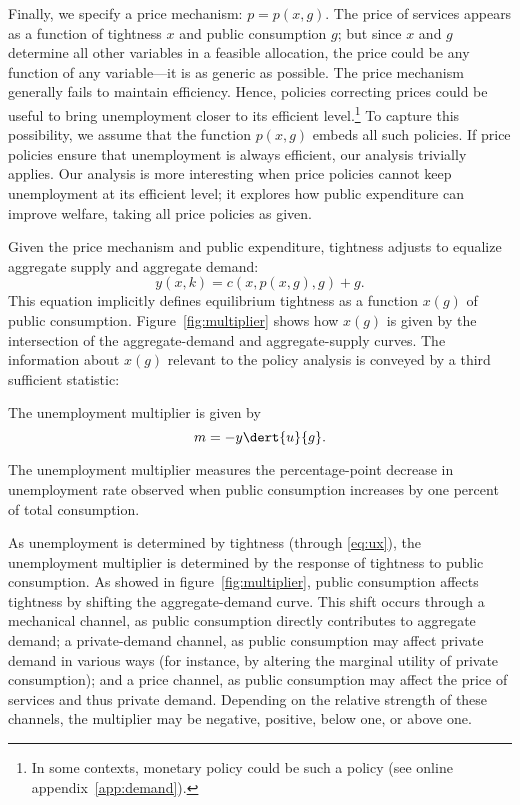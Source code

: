 \documentclass[letterpaper,12pt,leqno]{article}
\begin{document}
\begin{bibunit}
Finally, we specify a price mechanism: $p=p(x,g)$. The price of services appears as a function of tightness $x$ and public consumption $g$; but since $x$ and $g$ determine all other variables in a feasible allocation, the price could be any function of any variable---it is as generic as possible. The price mechanism generally fails to maintain efficiency. Hence, policies correcting prices could be useful to bring unemployment closer to its efficient level.\footnote{In some contexts, monetary policy could be such a policy (see online appendix~\ref{app:demand}).} To capture this possibility, we assume that the function $p(x,g)$ embeds all such policies. If price policies ensure that unemployment is always efficient, our analysis trivially applies. Our analysis is more interesting when price policies cannot keep unemployment at its efficient level; it explores how public expenditure can improve welfare, taking all price policies as given.

Given the price mechanism and public expenditure, tightness adjusts to equalize aggregate supply and aggregate demand:
\begin{equation}
y(x,k)=c(x,p(x,g),g)+g.
\label{eq:xg}\end{equation}
This equation implicitly defines equilibrium tightness as a function $x(g)$ of public consumption. Figure~\ref{fig:multiplier} shows how $x(g)$ is given by the intersection of the aggregate-demand and aggregate-supply curves. The information about $x(g)$ relevant to the policy analysis is conveyed by a third sufficient statistic:

\begin{defn} The unemployment multiplier is given by
\begin{equation}
m = - y \dert{u}{g}.
\label{eq:m}\end{equation}\end{defn}

The unemployment multiplier measures the percentage-point decrease in unemployment rate observed when public consumption increases by one percent of total consumption.

As unemployment is determined by tightness (through \eqref{eq:ux}), the unemployment multiplier is determined by the response of tightness to public consumption. As showed in figure~\ref{fig:multiplier}, public consumption affects tightness by shifting the aggregate-demand curve. This shift occurs through a mechanical channel, as public consumption directly contributes to aggregate demand; a private-demand channel, as public consumption may affect private demand in various ways (for instance, by altering the marginal utility of private consumption); and a price channel, as public consumption may affect the price of services and thus private demand. Depending on the relative strength of these channels, the multiplier may be negative, positive, below one, or above one.


\end{bibunit}
\end{document}
